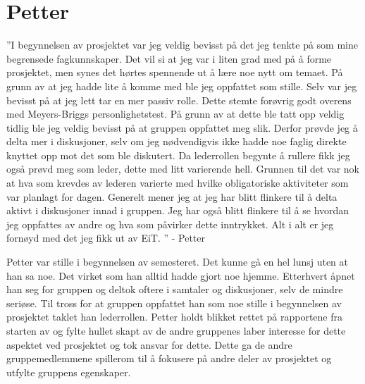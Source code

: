 \section{Petter}
''I begynnelsen av prosjektet var jeg veldig bevisst på det jeg tenkte på som mine begrensede fagkunnskaper. 
Det vil si at jeg var i liten grad med på å forme prosjektet, men synes det hørtes spennende ut å lære noe nytt om temaet. 
På grunn av at jeg hadde lite å komme med ble jeg oppfattet som stille. 
Selv var jeg bevisst på at jeg lett tar en mer passiv rolle. 
Dette stemte forøvrig godt overens med Meyers-Briggs personlighetstest. 
På grunn av at dette ble tatt opp veldig tidlig ble jeg veldig bevisst på at gruppen oppfattet meg slik. 
Derfor prøvde jeg å delta mer i diskusjoner, selv om jeg nødvendigvis ikke hadde noe faglig direkte knyttet opp mot det som ble diskutert. 
Da lederrollen begynte å rullere fikk jeg også prøvd meg som leder, dette med litt varierende hell. 
Grunnen til det var nok at hva som krevdes av lederen varierte med hvilke obligatoriske aktiviteter som var planlagt for dagen. 
Generelt mener jeg at jeg har blitt flinkere til å delta aktivt i diskusjoner innad i gruppen. 
Jeg har også blitt flinkere til å se hvordan jeg oppfattes av andre og hva som påvirker dette inntrykket. 
Alt i alt er jeg fornøyd med det jeg fikk ut av EiT. '' \hfill - Petter
\vspace{\secspace}

Petter var stille i begynnelsen av semesteret.
Det kunne gå en hel lunsj uten at han sa noe.
Det virket som han alltid hadde gjort noe hjemme.
Etterhvert åpnet han seg for gruppen og deltok oftere i samtaler og diskusjoner, selv de mindre seriøse.
Til tross for at gruppen oppfattet han som noe stille i begynnelsen av prosjektet taklet han lederrollen.
Petter holdt blikket rettet på rapportene fra starten av og fylte hullet skapt av de andre gruppenes laber interesse for dette aspektet ved prosjektet og tok ansvar for dette.
Dette ga de andre gruppemedlemmene spillerom til å fokusere på andre deler av prosjektet og utfylte gruppens egenskaper.

